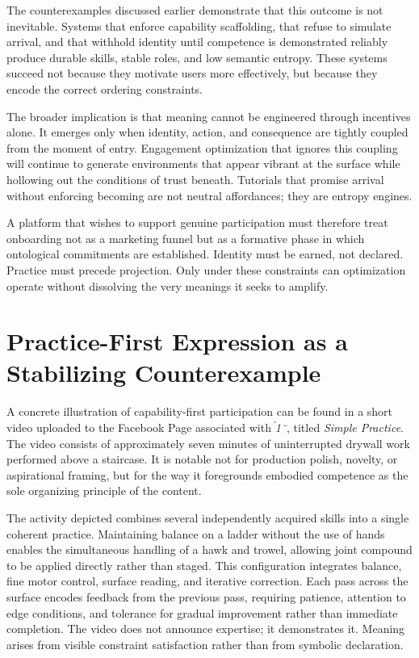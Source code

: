 \documentclass[11pt,oneside]{article}
\begin{document}
The counterexamples discussed earlier demonstrate that this outcome is not inevitable. Systems that enforce capability scaffolding, that refuse to simulate arrival, and that withhold identity until competence is demonstrated reliably produce durable skills, stable roles, and low semantic entropy. These systems succeed not because they motivate users more effectively, but because they encode the correct ordering constraints.

The broader implication is that meaning cannot be engineered through incentives alone. It emerges only when identity, action, and consequence are tightly coupled from the moment of entry. Engagement optimization that ignores this coupling will continue to generate environments that appear vibrant at the surface while hollowing out the conditions of trust beneath. Tutorials that promise arrival without enforcing becoming are not neutral affordances; they are entropy engines.

A platform that wishes to support genuine participation must therefore treat onboarding not as a marketing funnel but as a formative phase in which ontological commitments are established. Identity must be earned, not declared. Practice must precede projection. Only under these constraints can optimization operate without dissolving the very meanings it seeks to amplify.

\section{Practice-First Expression as a Stabilizing Counterexample}

A concrete illustration of capability-first participation can be found in a short video uploaded to the Facebook Page associated with \textit{1}, titled \textit{Simple Practice}. The video consists of approximately seven minutes of uninterrupted drywall work performed above a staircase. It is notable not for production polish, novelty, or aspirational framing, but for the way it foregrounds embodied competence as the sole organizing principle of the content.

The activity depicted combines several independently acquired skills into a single coherent practice. Maintaining balance on a ladder without the use of hands enables the simultaneous handling of a hawk and trowel, allowing joint compound to be applied directly rather than staged. This configuration integrates balance, fine motor control, surface reading, and iterative correction. Each pass across the surface encodes feedback from the previous pass, requiring patience, attention to edge conditions, and tolerance for gradual improvement rather than immediate completion. The video does not announce expertise; it demonstrates it. Meaning arises from visible constraint satisfaction rather than from symbolic declaration.
\end{document}
